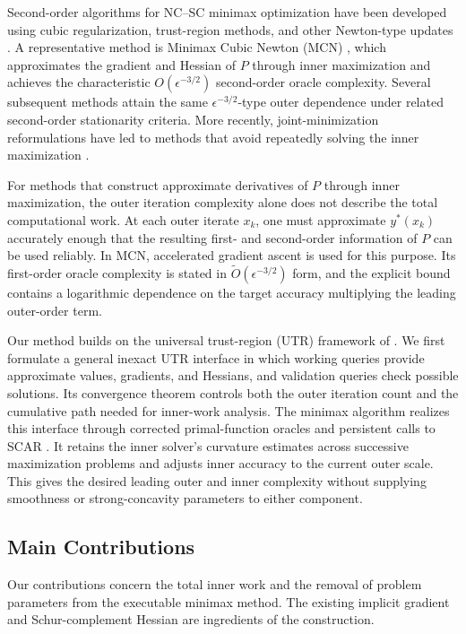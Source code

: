 \documentclass{article}
\begin{document}
Second-order algorithms for NC--SC minimax optimization have been
developed using cubic regularization, trust-region methods, and other
Newton-type updates
\citep{luo2022finding,chen2023cubic,yao2025trust,
wang2025gradient,chen2026hsda}.
A representative method is Minimax Cubic Newton (MCN)
\citep{luo2022finding}, which approximates the gradient and Hessian of
$P$ through inner maximization and achieves the characteristic
$O(\epsilon^{-3/2})$ second-order oracle complexity. Several subsequent
methods attain the same $\epsilon^{-3/2}$-type outer dependence under
related second-order stationarity criteria. More recently,
joint-minimization reformulations have led to methods that avoid
repeatedly solving the inner maximization
\citep{ma2026linesearch,ma2026singleloop}.

For methods that construct approximate derivatives of $P$ through
inner maximization, the outer iteration complexity alone does not
describe the total computational work. At each outer iterate $x_k$,
one must approximate $y^*(x_k)$ accurately enough that the resulting
first- and second-order information of $P$ can be used reliably.
In MCN, accelerated gradient ascent is used for this purpose.
Its first-order oracle complexity is stated in
$\widetilde O(\epsilon^{-3/2})$ form, and the explicit bound contains a
logarithmic dependence on the target accuracy multiplying the leading
outer-order term. 

Our method builds on the universal trust-region (UTR) framework of
\citet{jiang2026utr}. We first formulate a general inexact UTR
interface in which working queries provide approximate values,
gradients, and Hessians, and validation queries check possible
solutions. Its convergence theorem controls both the outer iteration
count and the cumulative path needed for inner-work analysis.
The minimax algorithm realizes this interface through corrected
primal-function oracles and persistent calls to SCAR
\citep{lan2026optimal}. It retains the inner solver's curvature
estimates across successive maximization problems and adjusts inner
accuracy to the current outer scale. This gives the desired leading
outer and inner complexity without supplying smoothness or
strong-concavity parameters to either component.

\subsection{Main Contributions}
\label{sec:contributions}

Our contributions concern the total inner work and the removal of
problem parameters from the executable minimax method. The existing
implicit gradient and Schur-complement Hessian are ingredients of
the construction.
\end{document}
